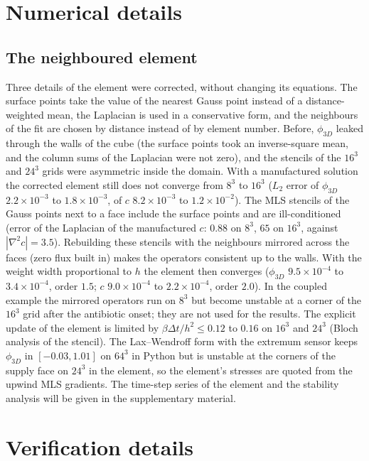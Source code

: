 \documentclass[11pt,a4paper]{article}
\newcommand{\phiD}{\phi_{3D}}
\begin{document}
\appendix

\section{Numerical details}
\label{app:numerics}

\subsection{The neighboured element}
\label{app:element}

Three details of the element were corrected, without changing its equations. The surface points take the value of the nearest Gauss point instead of a distance-weighted mean, the Laplacian is used in a conservative form, and the neighbours of the fit are chosen by distance instead of by element number. Before, $\phiD$ leaked through the walls of the cube (the surface points took an inverse-square mean, and the column sums of the Laplacian were not zero), and the stencils of the $16^3$ and $24^3$ grids were asymmetric inside the domain. With a manufactured solution the corrected element still does not converge from $8^3$ to $16^3$ ($L_2$ error of $\phiD$ $2.2\times10^{-3}$ to $1.8\times10^{-3}$, of $c$ $8.2\times10^{-3}$ to $1.2\times10^{-2}$). The MLS stencils of the Gauss points next to a face include the surface points and are ill-conditioned (error of the Laplacian of the manufactured $c$: $0.88$ on $8^3$, $65$ on $16^3$, against $|\nabla^2c|=3.5$). Rebuilding these stencils with the neighbours mirrored across the faces (zero flux built in) makes the operators consistent up to the walls. With the weight width proportional to $h$ the element then converges ($\phiD$ $9.5\times10^{-4}$ to $3.4\times10^{-4}$, order $1.5$; $c$ $9.0\times10^{-4}$ to $2.2\times10^{-4}$, order $2.0$). In the coupled example the mirrored operators run on $8^3$ but become unstable at a corner of the $16^3$ grid after the antibiotic onset; they are not used for the results. The explicit update of the element is limited by $\beta\Delta t/h^2\le0.12$ to $0.16$ on $16^3$ and $24^3$ (Bloch analysis of the stencil). The Lax--Wendroff form with the extremum sensor keeps $\phiD$ in $[-0.03,1.01]$ on $64^3$ in Python but is unstable at the corners of the supply face on $24^3$ in the element, so the element's stresses are quoted from the upwind MLS gradients. The time-step series of the element and the stability analysis will be given in the supplementary material.

\section{Verification details}
\label{app:verification}
\end{document}
